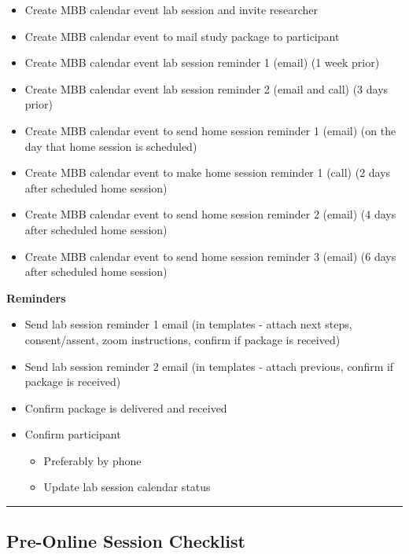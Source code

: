 \documentclass[]{book}
\providecommand{\tightlist}{%
  \setlength{\itemsep}{0pt}\setlength{\parskip}{0pt}}
\begin{document}
\begin{itemize}
\tightlist
\item
  Create MBB calendar event lab session and invite researcher
\item
  Create MBB calendar event to mail study package to participant
\item
  Create MBB calendar event lab session reminder 1 (email) (1 week prior)
\item
  Create MBB calendar event lab session reminder 2 (email and call) (3 days prior)
\item
  Create MBB calendar event to send home session reminder 1 (email) (on the day that home session is scheduled)
\item
  Create MBB calendar event to make home session reminder 1 (call) (2 days after scheduled home session)
\item
  Create MBB calendar event to send home session reminder 2 (email) (4 days after scheduled home session)
\item
  Create MBB calendar event to send home session reminder 3 (email) (6 days after scheduled home session)
\end{itemize}

\textbf{Reminders}

\begin{itemize}
\tightlist
\item
  Send lab session reminder 1 email (in templates - attach next steps, consent/assent, zoom instructions, confirm if package is received)
\item
  Send lab session reminder 2 email (in templates - attach previous, confirm if package is received)
\item
  Confirm package is delivered and received
\item
  Confirm participant

  \begin{itemize}
  \tightlist
  \item
    Preferably by phone
  \item
    Update lab session calendar status
  \end{itemize}
\end{itemize}

\begin{center}\rule{0.5\linewidth}{0.5pt}\end{center}

\hypertarget{pre-online-session-checklist}{%
\subsection{Pre-Online Session Checklist}\label{pre-online-session-checklist}}
\end{document}
